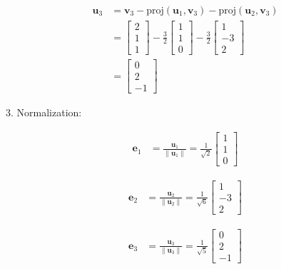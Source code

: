    \[
   \begin{aligned}
   \mathbf{u}_3 &= \mathbf{v}_3 - \text{proj}(\mathbf{u}_1, \mathbf{v}_3) - \text{proj}(\mathbf{u}_2, \mathbf{v}_3) \\
   &= \begin{bmatrix} 2 \\ 1 \\ 1 \end{bmatrix} - \frac{3}{2} \begin{bmatrix} 1 \\ 1 \\ 0 \end{bmatrix} - \frac{3}{2} \begin{bmatrix} 1 \\ -3 \\ 2 \end{bmatrix} \\
   &= \begin{bmatrix} 0 \\ 2 \\ -1 \end{bmatrix}
   \end{aligned}
   \]

3. Normalization:

   \[
   \begin{aligned}
   \mathbf{e}_1 &= \frac{\mathbf{u}_1}{\|\mathbf{u}_1\|} = \frac{1}{\sqrt{2}} \begin{bmatrix} 1 \\ 1 \\ 0 \end{bmatrix}
   \end{aligned}
   \]

   \[
   \begin{aligned}
   \mathbf{e}_2 &= \frac{\mathbf{u}_2}{\|\mathbf{u}_2\|} = \frac{1}{\sqrt{6}} \begin{bmatrix} 1 \\ -3 \\ 2 \end{bmatrix}
   \end{aligned}
   \]

   \[
   \begin{aligned}
   \mathbf{e}_3 &= \frac{\mathbf{u}_3}{\|\mathbf{u}_3\|} = \frac{1}{\sqrt{5}} \begin{bmatrix} 0 \\ 2 \\ -1 \end{bmatrix}
   \end{aligned}
   \]

